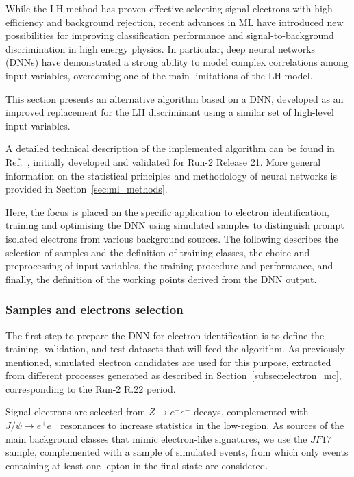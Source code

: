 While the LH method has proven effective selecting signal electrons with high efficiency and background rejection, recent advances in ML have introduced new possibilities for improving classification performance and signal-to-background discrimination in high energy physics. In particular, deep neural networks (DNNs) have demonstrated a strong ability to model complex correlations among input variables, overcoming one of the main limitations of the LH model.

This section presents an alternative algorithm based on a DNN, developed as an improved replacement for the LH discriminant using a similar set of high-level input variables.

A detailed technical description of the implemented algorithm can be found in Ref.~\cite{dnn_paper}, initially developed and validated for Run-2 Release 21. More general information on the statistical principles and methodology of neural networks is provided in Section~\ref{sec:ml_methods}.

Here, the focus is placed on the specific application to electron identification, training and optimising the DNN using simulated samples to distinguish prompt isolated electrons from various background sources. The following describes the selection of samples and the definition of training classes, the choice and preprocessing of input variables, the training procedure and performance, and finally, the definition of the working points derived from the DNN output.

\subsubsection{Samples and electrons selection}
The first step to prepare the DNN for electron identification is to define the training, validation, and test datasets that will feed the algorithm. As previously mentioned, simulated electron candidates are used for this purpose, extracted from different processes generated as described in Section~\ref{subsec:electron_mc}, corresponding to the Run-2 R.22 period.

Signal electrons are selected from $Z \rightarrow e^{+}e^{-}$ decays, complemented with $J/\psi \rightarrow e^{+}e^{-}$ resonances to increase statistics in the low-\et region. As sources of the main background classes that mimic electron-like signatures, we use the $JF17$ sample, complemented with a sample of simulated \ttbar events, from which only events containing at least one lepton in the final state are considered.

